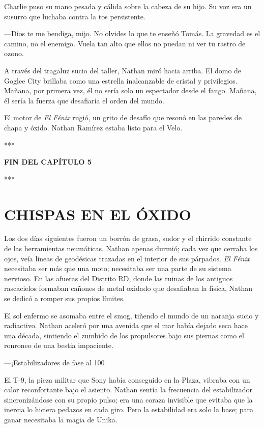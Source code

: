 \documentclass[11pt,twoside]{book}
\begin{document}
Charlie puso su mano pesada y cálida sobre la cabeza de su hijo. Su voz era un susurro que luchaba contra la tos persistente.

---Dios te me bendiga, mijo. No olvides lo que te enseñó Tomás. La gravedad es el camino, no el enemigo. Vuela tan alto que ellos no puedan ni ver tu rastro de ozono.

A través del tragaluz sucio del taller, Nathan miró hacia arriba. El domo de Goglee City brillaba como una estrella inalcanzable de cristal y privilegios. Mañana, por primera vez, él no sería solo un espectador desde el fango. Mañana, él sería la fuerza que desafiaría el orden del mundo.

El motor de \textit{El Fénix} rugió, un grito de desafío que resonó en las paredes de chapa y óxido. Nathan Ramírez estaba listo para el Velo.

\bigskip
\begin{center}***\end{center}
\bigskip

\textbf{FIN DEL CAPÍTULO 5}


\bigskip
\begin{center}***\end{center}
\bigskip

\chapter{CHISPAS EN EL ÓXIDO}

Los dos días siguientes fueron un borrón de grasa, sudor y el chirrido constante de las herramientas neumáticas. Nathan apenas durmió; cada vez que cerraba los ojos, veía líneas de geodésicas trazadas en el interior de sus párpados. \textit{El Fénix} necesitaba ser más que una moto; necesitaba ser una parte de su sistema nervioso. En las afueras del Distrito RD, donde las ruinas de los antiguos rascacielos formaban cañones de metal oxidado que desafiaban la física, Nathan se dedicó a romper sus propios límites.

El sol enfermo se asomaba entre el smog, tiñendo el mundo de un naranja sucio y radiactivo. Nathan aceleró por una avenida que el mar había dejado seca hace una década, sintiendo el zumbido de los propulsores bajo sus piernas como el ronroneo de una bestia impaciente.

---¡Estabilizadores de fase al 100%

El T-9, la pieza militar que Sony había conseguido en la Plaza, vibraba con un calor reconfortante bajo el asiento. Nathan sentía la frecuencia del estabilizador sincronizándose con su propio pulso; era una coraza invisible que evitaba que la inercia lo hiciera pedazos en cada giro. Pero la estabilidad era solo la base; para ganar necesitaba la magia de Unika.
\end{document}

